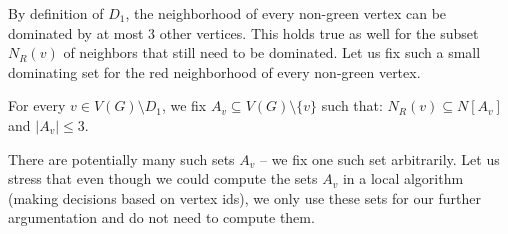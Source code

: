 \smallskip By definition of $D_1$, the neighborhood of every non-green
vertex can be dominated by at most $3$ other vertices. This holds true
as well for the subset $N_R(v)$ of neighbors that still need to be
dominated.  Let us fix such a small dominating set for the red
neighborhood of every non-green vertex.

\begin{tcolorbox}
  For every $v\in V(G)\setminus D_1$, we fix
  $A_v\subseteq V(G)\setminus \{v\}$ such that: \center
  $N_R(v)\subseteq N[A_v]$ and $|A_v|\leq 3$.
\end{tcolorbox}

There are potentially many such sets $A_v$ -- we fix one such set
arbitrarily.  Let us stress that even though we could compute the sets
$A_v$ in a local algorithm (making decisions based on vertex ids), we
only use these sets for our further argumentation and do not need to
compute them.
